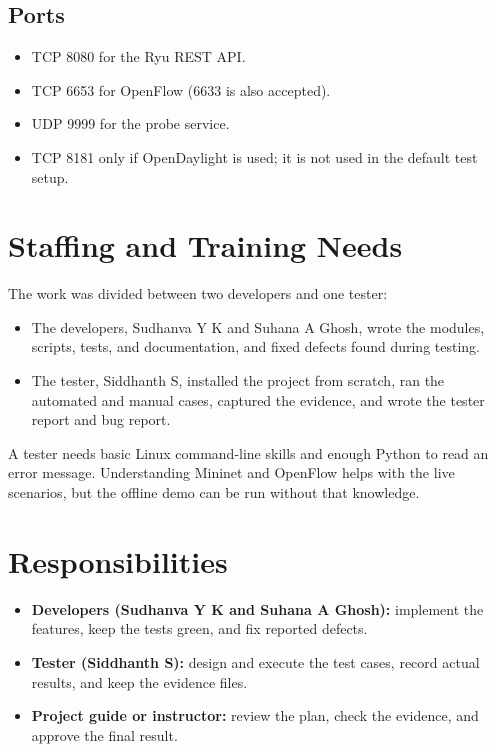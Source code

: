 \documentclass[11pt,a4paper]{article}
\begin{document}
\subsection*{Ports}
\begin{itemize}
  \item TCP 8080 for the Ryu REST API.
  \item TCP 6653 for OpenFlow (6633 is also accepted).
  \item UDP 9999 for the probe service.
  \item TCP 8181 only if OpenDaylight is used; it is not used in the default test setup.
\end{itemize}

\section{Staffing and Training Needs}
The work was divided between two developers and one tester:
\begin{itemize}
  \item The developers, Sudhanva Y K and Suhana A Ghosh, wrote the modules, scripts, tests, and documentation, and fixed defects found during testing.
  \item The tester, Siddhanth S, installed the project from scratch, ran the automated and manual cases, captured the evidence, and wrote the tester report and bug report.
\end{itemize}

A tester needs basic Linux command-line skills and enough Python to read an error message. Understanding Mininet and OpenFlow helps with the live scenarios, but the offline demo can be run without that knowledge.

\section{Responsibilities}
\begin{itemize}
  \item \textbf{Developers (Sudhanva Y K and Suhana A Ghosh):} implement the features, keep the tests green, and fix reported defects.
  \item \textbf{Tester (Siddhanth S):} design and execute the test cases, record actual results, and keep the evidence files.
  \item \textbf{Project guide or instructor:} review the plan, check the evidence, and approve the final result.
\end{itemize}
\end{document}
